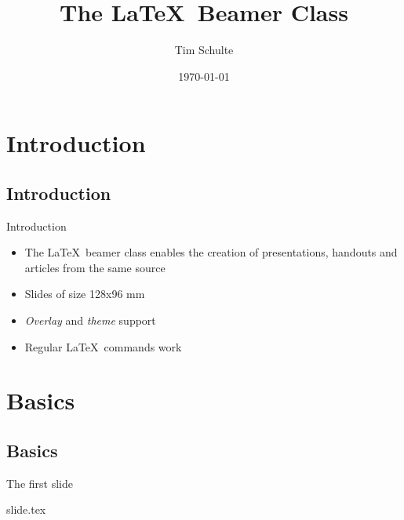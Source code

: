 \documentclass[xcolor=x11names, xcolor=table]{beamer}
\begin{document}
\author{Tim Schulte}
\title{The \LaTeX\ Beamer Class}
\date{\today}


\begin{frame}[plain]
    \titlepage
\end{frame}


\section{Introduction}
\subsection{Introduction}
\begin{frame}{Introduction}
    \begin{itemize}
            \item
    The \LaTeX\ beamer class enables the creation of presentations, handouts and
    articles from the same source
        \item Slides of size 128x96 mm
        \item \emph{Overlay} and \emph{theme} support
        \item Regular \LaTeX\ commands work
    \end{itemize}
\end{frame}


\section{Basics}
\subsection{Basics}
\begin{frame}[fragile]{The first slide}
    \begin{block}{slide.tex}
        \inputminted{latex}{tex/first-slide.tex}
    \end{block}
\end{frame}
\end{document}
